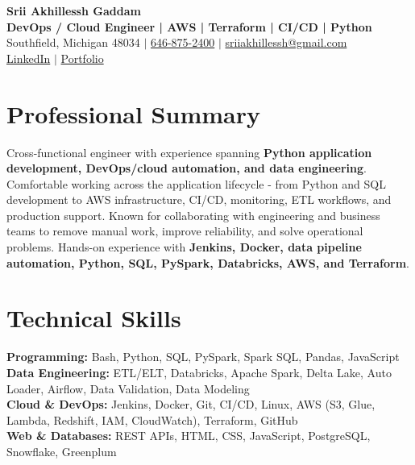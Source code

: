 \documentclass[letterpaper,10pt]{article}
\begin{document}
\fontsize{9.35pt}{10.45pt}\selectfont

\begin{center}
    {\LARGE \textbf{Srii Akhillessh Gaddam}} \\[-1pt]
    \textbf{DevOps / Cloud Engineer | AWS | Terraform | CI/CD | Python} \\[2pt]
    Southfield, Michigan 48034 $|$
    \href{tel:6468752400}{646-875-2400} $|$
    \href{mailto:sriiakhillessh@gmail.com}{sriiakhillessh@gmail.com} \\[1pt]
    \href{https://www.linkedin.com/in/srii-akhiilessh-gaddam-b48668191/}{LinkedIn} $|$
    \href{https://sriiakhillesshg.github.io/portfolio/}{Portfolio}
\end{center}
\vspace{-8pt}

\section{Professional Summary}
\small{Cross-functional engineer with experience spanning \textbf{Python application development, DevOps/cloud automation, and data engineering}. Comfortable working across the application lifecycle - from Python and SQL development to AWS infrastructure, CI/CD, monitoring, ETL workflows, and production support. Known for collaborating with engineering and business teams to remove manual work, improve reliability, and solve operational problems. Hands-on experience with \textbf{Jenkins, Docker, data pipeline automation, Python, SQL, PySpark, Databricks, AWS, and Terraform}.}

\section{Technical Skills}
\small{
\textbf{Programming:} Bash, Python, SQL, PySpark, Spark SQL, Pandas, JavaScript \\
\textbf{Data Engineering:} ETL/ELT, Databricks, Apache Spark, Delta Lake, Auto Loader, Airflow, Data Validation, Data Modeling \\
\textbf{Cloud \& DevOps:} Jenkins, Docker, Git, CI/CD, Linux, AWS (S3, Glue, Lambda, Redshift, IAM, CloudWatch), Terraform, GitHub \\
\textbf{Web \& Databases:} REST APIs, HTML, CSS, JavaScript, PostgreSQL, Snowflake, Greenplum
}
\end{document}

